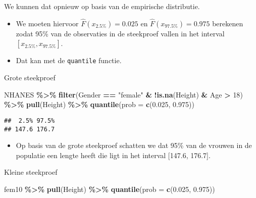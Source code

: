 \documentclass[
  12pt,dutch,coursenotes]{book}
\newenvironment{Shaded}{\begin{snugshade}}{\end{snugshade}}
\newcommand{\DataTypeTok}[1]{\textcolor[rgb]{0.13,0.29,0.53}{#1}}
\newcommand{\DecValTok}[1]{\textcolor[rgb]{0.00,0.00,0.81}{#1}}
\newcommand{\FloatTok}[1]{\textcolor[rgb]{0.00,0.00,0.81}{#1}}
\newcommand{\KeywordTok}[1]{\textcolor[rgb]{0.13,0.29,0.53}{\textbf{#1}}}
\newcommand{\NormalTok}[1]{#1}
\newcommand{\OperatorTok}[1]{\textcolor[rgb]{0.81,0.36,0.00}{\textbf{#1}}}
\newcommand{\StringTok}[1]{\textcolor[rgb]{0.31,0.60,0.02}{#1}}
\providecommand{\tightlist}{%
  \setlength{\itemsep}{0pt}\setlength{\parskip}{0pt}}
\theoremstyle{definition}
\theoremstyle{definition}
\theoremstyle{definition}
\theoremstyle{remark}
\begin{document}
We kunnen dat opnieuw op basis van de empirische distributie.

\begin{itemize}
\item
  We moeten hiervoor \(\hat{F}(x_{2.5\%})=0.025\) en \(\hat{F}(x_{97.5\%})=0.975\) berekenen zodat 95\% van de observaties in de steekproef vallen in het interval \([x_{2.5\%},x_{97.5\%}]\).
\item
  Dat kan met de \texttt{quantile} functie.
\end{itemize}

Grote steekproef

\begin{Shaded}
\begin{Highlighting}[]
\NormalTok{NHANES }\OperatorTok{\%\textgreater{}\%}\StringTok{ }\KeywordTok{filter}\NormalTok{(Gender }\OperatorTok{==}\StringTok{ "female"} \OperatorTok{\&}\StringTok{ }\OperatorTok{!}\KeywordTok{is.na}\NormalTok{(Height) }\OperatorTok{\&}\StringTok{ }
\StringTok{    }\NormalTok{Age }\OperatorTok{\textgreater{}}\StringTok{ }\DecValTok{18}\NormalTok{) }\OperatorTok{\%\textgreater{}\%}\StringTok{ }\KeywordTok{pull}\NormalTok{(Height) }\OperatorTok{\%\textgreater{}\%}\StringTok{ }\KeywordTok{quantile}\NormalTok{(}\DataTypeTok{prob =} \KeywordTok{c}\NormalTok{(}\FloatTok{0.025}\NormalTok{, }
    \FloatTok{0.975}\NormalTok{))}
\end{Highlighting}
\end{Shaded}

\begin{verbatim}
##  2.5% 97.5% 
## 147.6 176.7
\end{verbatim}

\begin{itemize}
\tightlist
\item
  Op basis van de grote steekproef schatten we dat 95\% van de vrouwen in de populatie een lengte heeft die ligt in het interval {[}147.6, 176.7{]}.
\end{itemize}

Kleine steekproef

\begin{Shaded}
\begin{Highlighting}[]
\NormalTok{fem10 }\OperatorTok{\%\textgreater{}\%}\StringTok{ }\KeywordTok{pull}\NormalTok{(Height) }\OperatorTok{\%\textgreater{}\%}\StringTok{ }\KeywordTok{quantile}\NormalTok{(}\DataTypeTok{prob =} \KeywordTok{c}\NormalTok{(}\FloatTok{0.025}\NormalTok{, }
    \FloatTok{0.975}\NormalTok{))}
\end{Highlighting}
\end{Shaded}
\end{document}

